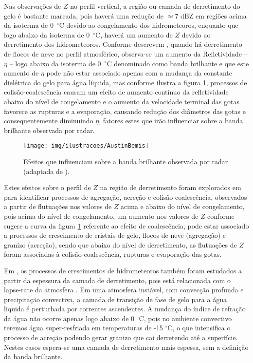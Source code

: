 Nas observações de $Z$ no perfil vertical, a região ou camada de derretimento do gelo é bastante marcada, pois haverá uma redução de $\simeq$7 dBZ em regiões acima da isoterma de {0~$^{\circ}$C} devido ao congelamento dos hidrometeoros, enquanto que logo abaixo da isoterma de 0~$^{\circ}$C, haverá um aumento de $Z$ devido ao derretimento dos hidrometeoros. Conforme descrevem , quando há derretimento de flocos de neve no perfil atmosférico, observa-se um aumento da Refletividade -- $\eta$ -- logo abaixo da isoterma de {0~$^{\circ}$C} denominado como banda brilhante e que este aumento de $\eta$ pode não estar associado apenas com a mudança da constante dielétrica do gelo para água líquida, mas conforme ilustra a figura \ref{Austin},  processos de colisão-coalescência causam um efeito de aumento contínuo da refletividade abaixo do nível de congelamento e o aumento da velocidade terminal das gotas favorece as rupturas e a evaporação, causando redução dos diâmetros das gotas e consequentemente diminuindo $\eta$,  fatores estes que irão influenciar sobre a banda brilhante observada por radar.

\begin{figure}[ht]
\centering
\texttt{[image: img/ilustracoes/AustinBemis]}
\caption{Efeitos que influenciam sobre a banda brilhante observada por radar (adaptada de ).}
\label{Austin}
\end{figure}

Estes efeitos sobre o perfil de $Z$ na região de derretimento  foram explorados em  para identificar processos de agregação, acreção e colisão coalescência, observados a partir de flutuações nos valores de $Z$ acima e abaixo do nível de congelamento, pois acima do nível de congelamento, um aumento nos valores de $Z$ conforme sugere a curva da figura \ref{Austin} referente ao efeito de coalescência, pode estar associado a processos de crescimento de cristais de gelo, flocos de neve (agregação) e granizo (acreção), sendo que abaixo do nível de derretimento, as flutuações de $Z$ foram associadas à colisão-coalescência, rupturas e evaporação das gotas. 

Em , os processos de crescimentos de hidrometeoros também foram estudados a partir da espessura da camada de derretimento, pois está relacionada com o lapse-rate da atmosfera \cite[p.~462]{austin1950,mason1971_2ed}. Em uma atmosfera instável, com convecção profunda e precipitação convectiva, a camada de transição de fase de gelo para a água liquida é perturbada por correntes ascendentes. A mudança do índice de refração da água não ocorre apenas logo abaixo de 0 $^{\circ}$C, pois no ambiente convectivo teremos água super-resfriada em temperaturas de -15 $^{\circ}$C, o que intensifica o processo de acreção podendo gerar granizo que cai derretendo até a superfície. Nestes casos espera-se uma camada de derretimento mais espessa, sem a definição da banda brilhante. 

